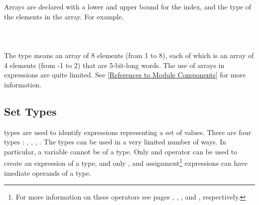 Arrays are declared with a lower and upper bound for the index, and
the type of the elements in the array. For example,\\

\indent{}\\
\indent{}\\
\indent{}\\

The type  means an array of
8 elements (from 1 to 8), each of which is an array of 4 elements
(from -1 to 2) that are 5-bit-long words.
%
The use of arrays in expressions are quite limited. See
\ref{References to Module Components} for more information.


% 
% 
% 
 
\subsection{Set Types}
\label{Set Types}

\Set types are used to identify expressions representing a set of values.
There are four \Set types : \BoolSet, \IntSet, \SymbSet, \IntSymbSet.
The \Set types can be used in a very limited number of ways. In
particular, a variable cannot be of a \Set type. Only  and  operator can be used to create an
expression of a \Set type, and only
,  and assignment\footnote{For more information
on these operators see  pages \pageref{Range Constant},
\pageref{Set Expressions},
\pageref{Inclusion Operator}, \pageref{Case Expressions} and 
\pageref{ASSIGN Constraint}, respectively.} expressions can have imediate operands of a \Set
type.

